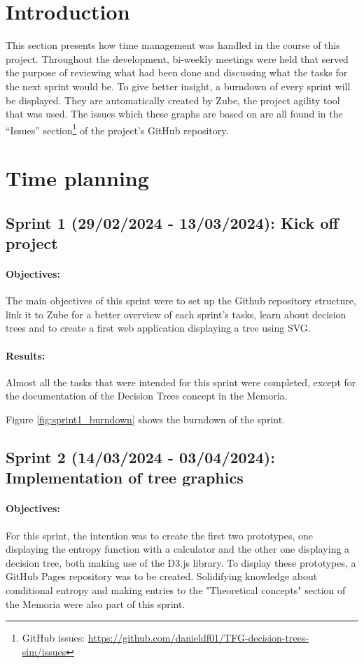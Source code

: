 
\section{Introduction}
This section presents how time management was handled in the course of this project. Throughout the development, bi-weekly meetings were held that served the purpose of reviewing what had been done and discussing what the tasks for the next sprint would be. To give better insight, a burndown of every sprint will be displayed. They are automatically created by Zube, the project agility tool that was used. The issues which these graphs are based on are all found in the ``Issues'' section\footnote{GitHub issues: \url{https://github.com/danieldf01/TFG-decision-trees-sim/issues}} of the project's GitHub repository.

\section{Time planning}
\subsection{Sprint 1 (29/02/2024 - 13/03/2024): Kick off project}
\paragraph{Objectives:}
The main objectives of this sprint were to set up the Github repository structure, link it to Zube for a better overview of each sprint's tasks, learn about decision trees and to create a first web application displaying a tree using SVG.

\paragraph{Results:}
Almost all the tasks that were intended for this sprint were completed, except for the documentation of the Decision Trees concept in the Memoria.

Figure \ref{fig:sprint1_burndown} shows the burndown of the sprint.

\subsection{Sprint 2 (14/03/2024 - 03/04/2024): Implementation of tree graphics}
\paragraph{Objectives:}
For this sprint, the intention was to create the first two prototypes, one displaying the entropy function with a calculator and the other one displaying a decision tree, both making use of the D3.js library. To display these prototypes, a GitHub Pages repository was to be created. Solidifying knowledge about conditional entropy and making entries to the "Theoretical concepts" section of the Memoria were also part of this sprint. 

